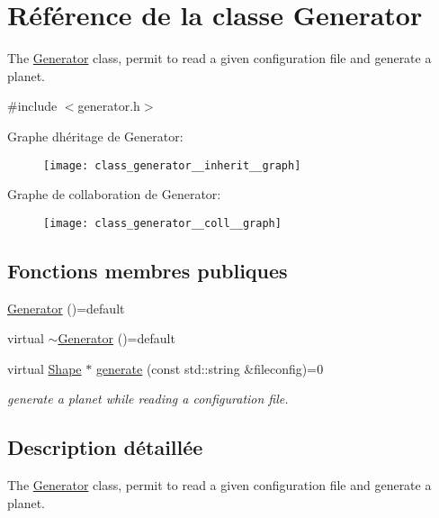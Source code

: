 \hypertarget{class_generator}{}\section{Référence de la classe Generator}
\label{class_generator}


The \hyperlink{class_generator}{Generator} class, permit to read a given configuration file and generate a planet.  




{\ttfamily \#include $<$generator.\+h$>$}



Graphe d\textquotesingle{}héritage de Generator\+:\nopagebreak
\begin{figure}[H]
\begin{center}
\leavevmode
\texttt{[image: class\_generator\_\_inherit\_\_graph]}
\end{center}
\end{figure}


Graphe de collaboration de Generator\+:\nopagebreak
\begin{figure}[H]
\begin{center}
\leavevmode
\texttt{[image: class\_generator\_\_coll\_\_graph]}
\end{center}
\end{figure}
\subsection*{Fonctions membres publiques}
\begin{DoxyCompactItemize}
\item 
\hyperlink{class_generator_aae25f1e872541b353e40fb0e4ee0dd45}{Generator} ()=default
\item 
virtual \hyperlink{class_generator_a175792ff2622a6ce48bf2adab7e09e58}{$\sim$\+Generator} ()=default
\item 
virtual \hyperlink{class_shape}{Shape} $\ast$ \hyperlink{class_generator_a0a421843bba544df32c3e10478eaabc7}{generate} (const std\+::string \&fileconfig)=0
\begin{DoxyCompactList}\small\item\em generate a planet while reading a configuration file. \end{DoxyCompactList}\end{DoxyCompactItemize}


\subsection{Description détaillée}
The \hyperlink{class_generator}{Generator} class, permit to read a given configuration file and generate a planet. 

